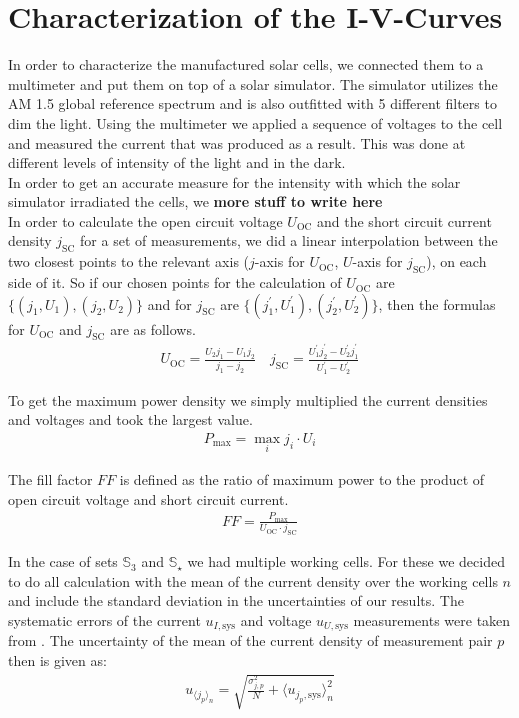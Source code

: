 
\newcommand{\Uoc}{U_{\text{OC}}}
\newcommand{\jsc}{j_{\text{SC}}}
\newcommand{\Pmax}{P_{\text{max}}}
\newcommand{\meann}[1]{\langle #1 \rangle_n}

\section{Characterization of the I-V-Curves}\label{sec:charac}

In order to characterize the manufactured solar cells, we connected them to a multimeter and put them on top of a solar simulator. The simulator utilizes the AM 1.5 global reference spectrum and is also outfitted with 5 different filters to dim the light. Using the multimeter we applied a sequence of voltages to the cell and measured the current that was produced as a result. This was done at different levels of intensity of the light and in the dark.\\
In order to get an accurate measure for the intensity with which the solar simulator irradiated the cells, we \textbf{more stuff to write here}\\
In order to calculate the open circuit voltage $\Uoc$ and the short circuit current density $\jsc$ for a set of measurements, we did a linear interpolation between the two closest points to the relevant axis ($j$-axis for $\Uoc$, $U$-axis for $\jsc$), on each side of it. So if our chosen points for the calculation of $\Uoc$ are $\{(j_1,U_1),(j_2,U_2)\}$ and for $\jsc$ are $\{(j_1^\prime,U_1^\prime),(j_2^\prime,U_2^\prime)\}$, then the formulas for $\Uoc$ and $\jsc$ are as follows.
\begin{align}
\Uoc = \frac{U_2 j_1 - U_1 j_2}{j_1-j_2}\quad \jsc = \frac{U_1^\prime j_2^\prime - U_2^\prime j_1^\prime}{U_1^\prime-U_2^\prime}
\end{align}

To get the maximum power density we simply multiplied the current densities and voltages and took the largest value.
\begin{align}
\Pmax = \max_{i} j_i\cdot U_i
\end{align}

The fill factor $FF$ is defined as the ratio of maximum power to the product of open circuit voltage and short circuit current.
\begin{align}
FF = \frac{\Pmax}{\Uoc \cdot \jsc}
\end{align}

In the case of sets $\mathbb{S}_3$ and $\mathbb{S}_\star$ we had multiple working cells. For these we decided to do all calculation with the mean of the current density over the working cells $n$ and include the standard deviation in the uncertainties of our results. The systematic errors of the current $u_{I,\text{sys}}$ and voltage $u_{U,\text{sys}}$ measurements were taken from \cite{keithley}. The uncertainty of the mean of the current density of measurement pair $p$ then is given as:
\begin{align}
u_{\meann{j_p}} = \sqrt{\frac{\sigma_{j,p}^2}{N} + \meann{u_{j_p,\text{sys}}}^2}
\end{align}

